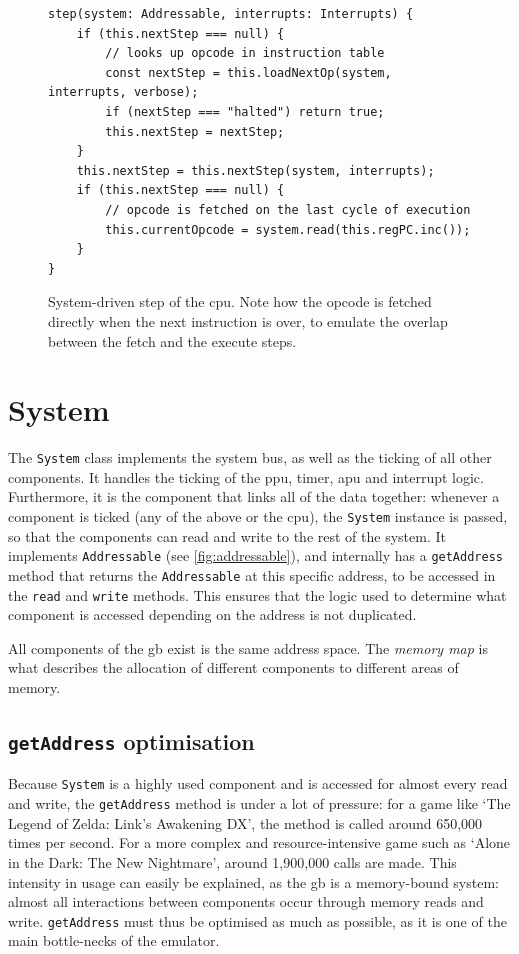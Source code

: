 \documentclass[11pt]{informatics-report}
\begin{document}
\begin{figure}[h]
    \begin{verbatim}
step(system: Addressable, interrupts: Interrupts) {
    if (this.nextStep === null) {
        // looks up opcode in instruction table
        const nextStep = this.loadNextOp(system, interrupts, verbose);
        if (nextStep === "halted") return true;
        this.nextStep = nextStep;
    }
    this.nextStep = this.nextStep(system, interrupts);
    if (this.nextStep === null) {
        // opcode is fetched on the last cycle of execution
        this.currentOpcode = system.read(this.regPC.inc());
    }
}
    \end{verbatim}
    \caption{System-driven step of the \gls{cpu}. Note how the opcode is fetched directly when the next instruction is over, to emulate the overlap between the fetch and the execute steps.}
    \label{fig:system-driven-cpu-tick}
\end{figure}


\section{System}

The \texttt{System} class implements the system bus, as well as the ticking of all other components. It handles the ticking of the \gls{ppu}, timer, \gls{apu} and interrupt logic. Furthermore, it is the component that links all of the data together: whenever a component is ticked (any of the above or the \gls{cpu}), the \texttt{System} instance is passed, so that the components can read and write to the rest of the system. It implements \texttt{Addressable} (see \ref{fig:addressable}), and internally has a \texttt{getAddress} method that returns the \texttt{Addressable} at this specific address, to be accessed in the \texttt{read} and \texttt{write} methods. This ensures that the logic used to determine what component is accessed depending on the address is not duplicated.

All components of the \glsdesc{gb} exist is the same address space. The \textit{memory map} is what describes the allocation of different components to different areas of memory.

\subsection{\texttt{getAddress} optimisation}

Because \texttt{System} is a highly used component and is accessed for almost every read and write, the \texttt{getAddress} method is under a lot of pressure: for a game like `The Legend of Zelda: Link's Awakening DX', the method is called around 650,000 times per second. For a more complex and resource-intensive game such as `Alone in the Dark: The New Nightmare', around 1,900,000 calls are made. This intensity in usage can easily be explained, as the \gls{gb} is a memory-bound system: almost all interactions between components occur through memory reads and write. \texttt{getAddress} must thus be optimised as much as possible, as it is one of the main bottle-necks of the emulator.
\end{document}
